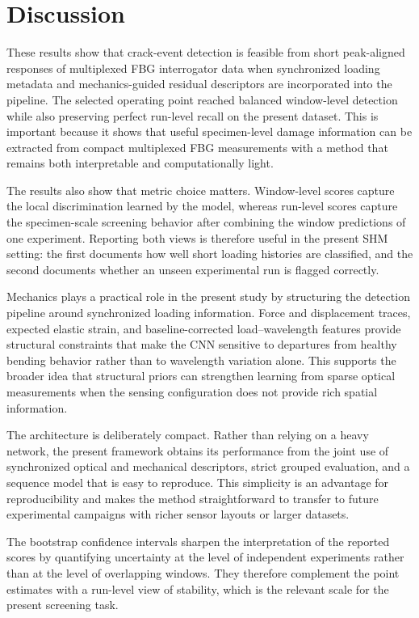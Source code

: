 \documentclass[notspecified,article,submit,pdftex,moreauthors]{Definitions/mdpi}
\begin{document}
\section{Discussion}

These results show that crack-event detection is feasible from short peak-aligned responses of multiplexed FBG interrogator data when synchronized loading metadata and mechanics-guided residual descriptors are incorporated into the pipeline. The selected operating point reached balanced window-level detection while also preserving perfect run-level recall on the present dataset. This is important because it shows that useful specimen-level damage information can be extracted from compact multiplexed FBG measurements with a method that remains both interpretable and computationally light.

The results also show that metric choice matters. Window-level scores capture the local discrimination learned by the model, whereas run-level scores capture the specimen-scale screening behavior after combining the window predictions of one experiment. Reporting both views is therefore useful in the present SHM setting: the first documents how well short loading histories are classified, and the second documents whether an unseen experimental run is flagged correctly.

Mechanics plays a practical role in the present study by structuring the detection pipeline around synchronized loading information. Force and displacement traces, expected elastic strain, and baseline-corrected load--wavelength features provide structural constraints that make the CNN sensitive to departures from healthy bending behavior rather than to wavelength variation alone. This supports the broader idea that structural priors can strengthen learning from sparse optical measurements when the sensing configuration does not provide rich spatial information.

The architecture is deliberately compact. Rather than relying on a heavy network, the present framework obtains its performance from the joint use of synchronized optical and mechanical descriptors, strict grouped evaluation, and a sequence model that is easy to reproduce. This simplicity is an advantage for reproducibility and makes the method straightforward to transfer to future experimental campaigns with richer sensor layouts or larger datasets.

The bootstrap confidence intervals sharpen the interpretation of the reported scores by quantifying uncertainty at the level of independent experiments rather than at the level of overlapping windows. They therefore complement the point estimates with a run-level view of stability, which is the relevant scale for the present screening task.
\end{document}
